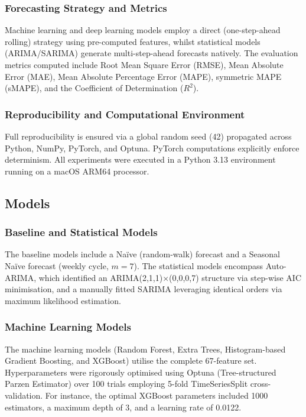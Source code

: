 \subsubsection{Forecasting Strategy and Metrics}
Machine learning and deep learning models employ a direct (one-step-ahead rolling) strategy using pre-computed features, whilst statistical models (ARIMA/SARIMA) generate multi-step-ahead forecasts natively. The evaluation metrics computed include Root Mean Square Error (RMSE), Mean Absolute Error (MAE), Mean Absolute Percentage Error (MAPE), symmetric MAPE (sMAPE), and the Coefficient of Determination ($R^2$). 

\subsubsection{Reproducibility and Computational Environment}
Full reproducibility is ensured via a global random seed (42) propagated across Python, NumPy, PyTorch, and Optuna. PyTorch computations explicitly enforce determinism. All experiments were executed in a Python 3.13 environment running on a macOS ARM64 processor.

\subsection{Models}

\subsubsection{Baseline and Statistical Models}
The baseline models include a Naïve (random-walk) forecast and a Seasonal Naïve forecast (weekly cycle, $m=7$). The statistical models encompass Auto-ARIMA, which identified an ARIMA(2,1,1)$\times$(0,0,0,7) structure via step-wise AIC minimisation, and a manually fitted SARIMA leveraging identical orders via maximum likelihood estimation.

\subsubsection{Machine Learning Models}
The machine learning models (Random Forest, Extra Trees, Histogram-based Gradient Boosting, and XGBoost) utilise the complete 67-feature set. Hyperparameters were rigorously optimised using Optuna (Tree-structured Parzen Estimator) over 100 trials employing 5-fold TimeSeriesSplit cross-validation. For instance, the optimal XGBoost parameters included 1000 estimators, a maximum depth of 3, and a learning rate of 0.0122.

